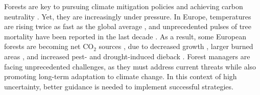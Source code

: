 \documentclass[11pt,letter]{article}
\begin{document}

Forests are key to pursuing climate mitigation policies and achieving carbon neutrality  \citep{Korosuo2023, Hyyrynen2023}. Yet, they are increasingly under pressure. In Europe, temperatures are rising twice as fast as the global average \citep{CCCS2024}, and unprecedented pulses of tree mortality  have been reported in the last decade \citep{Senf2020}. As a result, some European forests are becoming net CO$_2$ sources \citep{Hadden2016, Karelin2021}, due to decreased growth \citep{Hadden2016, Woude2023}, larger burned areas \citep{Carnicer2022, Kelly2024}, and increased pest- and drought-induced dieback \citep{Karelin2021, Cienciala2024, Latifovic2024}. Forest managers are facing unprecedented challenges, as they must address current threats while also promoting long-term adaptation to climate change. In this context of high uncertainty, better guidance is needed to implement successful strategies.
\end{document}
